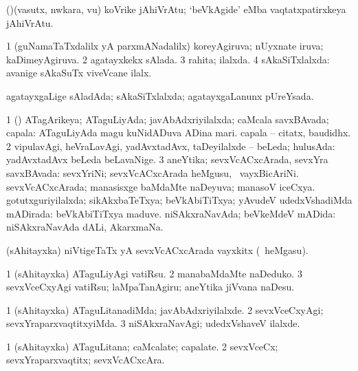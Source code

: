 \bentry 
{} 
\gl{\nA}
\expl{}
\bmng
(\ame)(vasutx, nwkara, \mo vu) koVrike jAhiVrAtu; `beVkAgide\eng' eMba vaqtatxpatirxkeya jAhiVrAtu. 
\emng
\eentry

\bentry
{} 
\gl{\gu}
\expl{}
\bmng
\bnum
\num{1} (guNamaTaTxdalilx yA parxmANadalilx) koreyAgiruva; nUyxnate iruva; kaDimeyAgiruva. 
\num{2} agatayxkekx sAlada. 
\num{3} rahita; ilalxda. 
\num{4} sAkaSiTxlalxda:  avanige sAkaSuTx viveVcane ilalx. 
\enum
\emng

\noindent 
\gl{\pagu}
\expl{}
\bmng
{} agatayxgaLige sAladAda; sAkaSiTxlalxda; agatayxgaLanunx pUreYsada. 
\emng
\eentry

\bentry 
{} 
\gl{\gu}
\expl{}
\bmng
\bnum
\num{1} (\pArxparx) ATagArikeya; ATaguLiyAda; javAbAdxriyilalxda; caMcala savxBAvada; capala:  ATaguLiyAda magu  kuNidADuva ADina mari.  capala -- citatx, baudidhx. 
\num{2} vipulavAgi, heVraLavAgi, yadAvxtadAvx, taDeyilalxde -- beLeda; hulusAda:  yadAvxtadAvx beLeda beLavaNige. 
\num{3} aneYtika; sevxVcACxcArada, sevxYra savxBAvada:  sevxYriNi; sevxVcACxcArada heMgusu, \kanmu\ vayxBicAriNi. 
\banum
{} sevxVcACxcArada; manasisxge baMdaMte naDeyuva; manasoV iceCxya. 
 gotutxguriyilalxda; sikAkxbaTeTxya; beVkAbiTiTxya; yAvudeV udedxVshadiMda mADirada:  beVkAbiTiTxya maduve. 
 niSAkxraNavAda; beVkeMdeV mADida:  niSAkxraNavAda dALi, AkarxmaNa. 
\eanum
\numie
\enum
\emng
\eentry

\bentry 
{} 
\gl{\nA}
\expl{}
\bmng
(sAhitayxka) niVtigeTaTx yA sevxVcACxcArada vayxkitx (\kanmu\ heMgasu). 
\emng
\eentry

\bentry 
{} 
\gl{\akirx}
\expl{}
\bmng
\bnum
\num{1} (sAhitayxka) ATaguLiyAgi vatiRsu. 
\num{2} manabaMdaMte naDeduko. 
\num{3} sevxVceCxyAgi vatiRsu; laMpaTanAgiru; aneYtika jiVvana naDesu. 
\enum
\emng
\eentry

\bentry
{} 
\gl{\kirxvi}
\expl{}
\bmng
\bnum
\num{1} (sAhitayxka) ATaguLitanadiMda; javAbAdxriyilalxde. 
\num{2} sevxVceCxyAgi; sevxYraparxvaqtitxyiMda. 
\num{3} niSAkxraNavAgi; udedxVshaveV ilalxde. 
\enum
\emng
\eentry

\bentry
{} 
\gl{\nA}
\expl{}
\bmng
\bnum
\num{1} (sAhitayxka) ATaguLitana; caMcalate; capalate. 
\num{2} sevxVceCx; sevxYraparxvaqtitx; sevxVcACxcAra. 
\enum
\emng
\eentry

